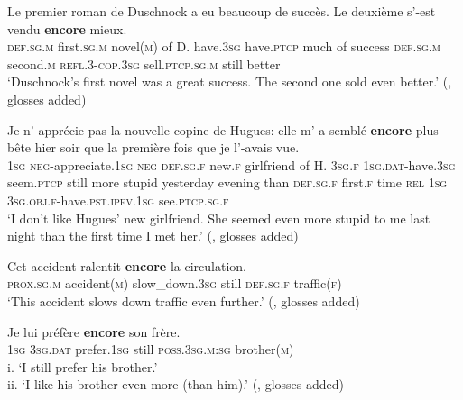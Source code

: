 \begin{exe}
	\ex \label{exappendixFrenchEncoreComparisons1}
	\gll Le premier roman de Duschnock a eu beaucoup de succès. Le deuxième s’-est vendu \textbf{encore} mieux.\\
	\textsc{def}.\textsc{sg}.\textsc{m} first.\textsc{sg}.\textsc{m} novel(\textsc{m}) of D. have.3\textsc{sg} have.\textsc{ptcp} much of success \textsc{def}.\textsc{sg}.\textsc{m} second.\textsc{m} \textsc{refl}.3-\textsc{cop}.3\textsc{sg} sell.\textsc{ptcp}.\textsc{sg}.\textsc{m} still better\\
	\glt \lq Duschnock’s first novel was a great success. The second one sold even better.’ (\cite[164]{MosegaardHansen2008}, glosses added)
	
	\ex\label{exAppendixFrenchEncoreComparativeTwoPoints}
	\gll Je n’-apprécie pas la nouvelle copine de Hugues: elle m’-a semblé \textbf{encore} plus bête hier soir que la première fois que je l’-avais vue.\\
	1\textsc{sg} \textsc{neg}-appreciate.1\textsc{sg} \textsc{neg} \textsc{def}.\textsc{sg}.\textsc{f} new.\textsc{f} girlfriend of H. 3\textsc{sg}.\textsc{f} 1\textsc{sg}.\textsc{dat}-have.3\textsc{sg} seem.\textsc{ptcp} still more stupid yesterday evening than \textsc{def}.\textsc{sg}.\textsc{f} first.\textsc{f} time \textsc{rel} 1\textsc{sg} 3\textsc{sg}.\textsc{obj}.\textsc{f}-have.\textsc{pst}.\textsc{ipfv}.1\textsc{sg} see.\textsc{ptcp}.\textsc{sg}.\textsc{f}\\
	\glt \lq I don’t like Hugues’ new girlfriend. She seemed even more stupid to me last night than the first time I met her.\rq{ }(\cite[164]{MosegaardHansen2008}, glosses added)

	\ex \label{exAppendixFrenchEncoreComparativeDegreeAchievement}
	\gll Cet accident ralentit \textbf{encore} la circulation.\\
	\textsc{prox}.\textsc{sg}.\textsc{m} accident(\textsc{m}) slow\_down.3\textsc{sg} still \textsc{def}.\textsc{sg}.\textsc{f} traffic(\textsc{f})\\
	\glt \lq This accident slows down traffic even further.\rq{ }(\cite[40]{Borillo1984}, glosses added)

	\ex \label{exAppendixFrenchEncoreComparativeVerb}
	\gll Je lui préfère \textbf{encore} son frère.\\
	1\textsc{sg} 3\textsc{sg}.\textsc{dat} prefer.1\textsc{sg} still \textsc{poss}.3\textsc{sg}.\textsc{m}:\textsc{sg} brother(\textsc{m})\\
	\glt \phantom{i}i. \lq I still prefer his brother.'\\
	ii. \lq I like his brother even more (than him).\rq{ }(\cite[145–146]{VictorriFuchs1992}, glosses added)
\end{exe}


